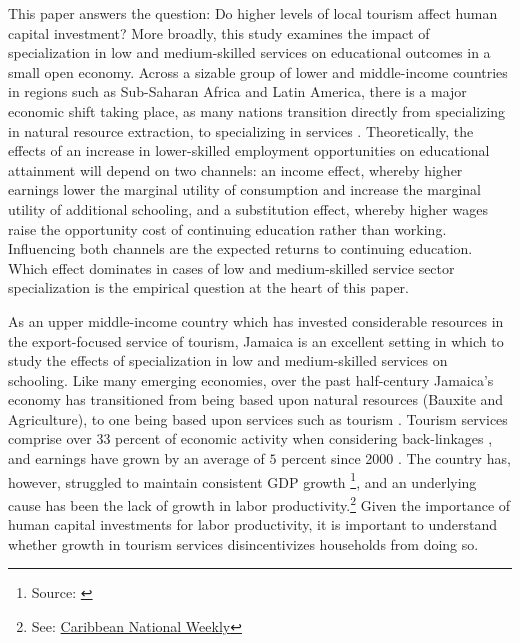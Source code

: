 \documentclass[12pt]{article}
\renewcommand\footnotesize{\fontsize{11}{13}\selectfont}
\begin{document}
    This paper answers the question: Do higher levels of local tourism affect human capital investment? More broadly, this study examines the impact of specialization in low and medium-skilled services on educational outcomes in a small open economy. Across a sizable group of lower and middle-income countries in regions such as Sub-Saharan Africa and Latin America, there is a major economic shift taking place, as many nations transition directly from specializing in natural resource extraction, to specializing in services \parencite{ nayyar_at_2021}. Theoretically, the effects of an increase in  lower-skilled employment opportunities on educational attainment will depend on two channels: an income effect, whereby higher earnings lower the marginal utility of consumption and increase the marginal utility of additional schooling, and a substitution effect, whereby higher wages raise the opportunity cost of continuing education rather than working. Influencing both channels are the expected returns to continuing education. Which effect dominates in cases of low and medium-skilled service sector specialization is the empirical question at the heart of this paper.
	
	
	As an upper middle-income country which has invested considerable resources in the export-focused service of tourism, Jamaica is an excellent setting in which to study the effects of specialization in low and medium-skilled services on schooling. Like many emerging economies, over the past half-century Jamaica's economy has transitioned from being based upon natural resources (Bauxite and Agriculture), to one being based upon services such as tourism \parencite{ king_evolution_2001}. Tourism services comprise over $33$ percent of economic activity when considering back-linkages \parencite { world_bank_jamaica_2022}, and earnings have grown by an average of $5$ percent since 2000 \parencite{ jamaican_ministry_of_tourism_annual_2025}. The country has, however, struggled to maintain consistent GDP growth \footnote{\footnotesize Source: \parencite{ world_bank_jamaica_2022}}, and an underlying cause has been the lack of growth in labor productivity.\footnote{\footnotesize See: \href{https://www.caribbeannationalweekly.com/opinion/opinion-jamaica-cant-grow-without-a-productivity-reset}{Caribbean National Weekly}} Given the importance of human capital investments for labor productivity,\parencite{ lucas_mechanics_1988} it is important to understand whether growth in tourism services disincentivizes households from doing so.
	
\end{document}
